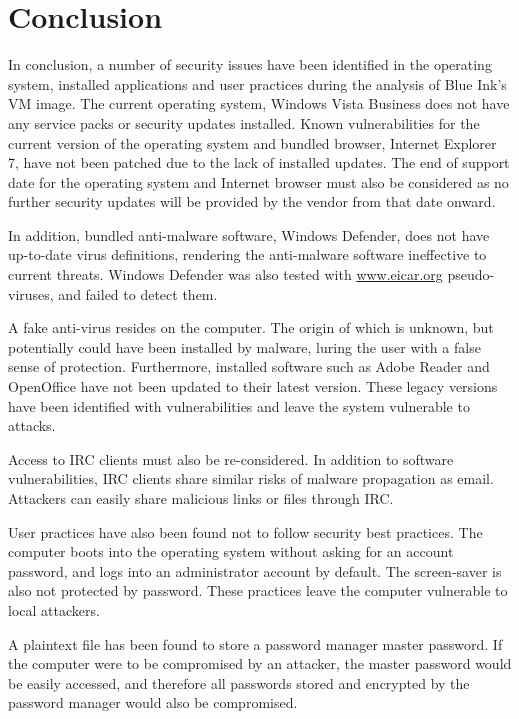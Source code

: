 \section{Conclusion}

In conclusion, a number of security issues have been identified in the operating system, installed applications and user practices during the analysis of Blue Ink's VM image. The current operating system, Windows Vista Business does not have any service packs or security updates installed. Known vulnerabilities for the current version of the operating system and bundled browser, Internet Explorer 7, have not been patched due to the lack of installed updates. The end of support date for the operating system and Internet browser must also be considered as no further security updates will be provided by the vendor from that date onward.

In addition, bundled anti-malware software, Windows Defender, does not have up-to-date virus definitions, rendering the anti-malware software ineffective to current threats. Windows Defender was also tested with \href{http://www.eicar.org/85-0-Download.html}{www.eicar.org} pseudo-viruses, and failed to detect them.

A fake anti-virus resides on the computer. The origin of which is unknown, but potentially could have been installed by malware, luring the user with a false sense of protection. Furthermore, installed software such as Adobe Reader and OpenOffice have not been updated to their latest version. These legacy versions have been identified with vulnerabilities and leave the system vulnerable to attacks.

Access to IRC clients must also be re-considered. In addition to software vulnerabilities, IRC clients share similar risks of malware propagation as email. Attackers can easily share malicious links or files through IRC.

User practices have also been found not to follow security best practices. The computer boots into the operating system without asking for an account password, and logs into an administrator account by default. The screen-saver is also not protected by password. These practices leave the computer vulnerable to local attackers.

A plaintext file has been found to store a password manager master password. If the computer were to be compromised by an attacker, the master password would be easily accessed, and therefore all passwords stored and encrypted by the password manager would also be compromised.

